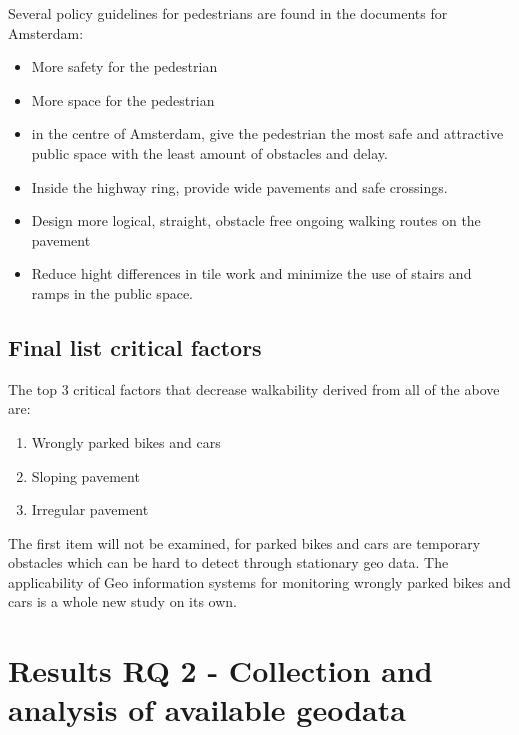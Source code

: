 Several policy guidelines for pedestrians are found in the documents for Amsterdam:

\begin{itemize}
\item More safety for the pedestrian~\cite{Bossink2011}
\item More space for the pedestrian~\cite{Bossink2011}
\item in the centre of Amsterdam, give the pedestrian the most safe and attractive public space with the least amount of obstacles and delay.~\cite{Kuik2013}
\item Inside the highway ring, provide wide pavements and safe crossings.~\cite{Kuik2013}
\item Design more logical, straight, obstacle free ongoing walking routes on the pavement~\cite{puccini2014}
\item Reduce hight differences in tile work and minimize the use of stairs and ramps in the public space.~\cite{puccini2014}
\end{itemize}

\subsection{Final list critical factors}\label{Rfinallist}
The top 3 critical factors that decrease walkability derived from all of the above are: 
\begin{enumerate}
\item Wrongly parked bikes and cars
\item Sloping pavement
\item Irregular pavement
\end{enumerate}

The first item will not be examined, for parked bikes and cars are temporary obstacles which can be hard to detect through stationary geo data. The applicability of Geo information systems for monitoring wrongly parked bikes and cars is a whole new study on its own.

\section{Results RQ 2 - Collection and analysis of available geodata}\label{Rrq2a}
